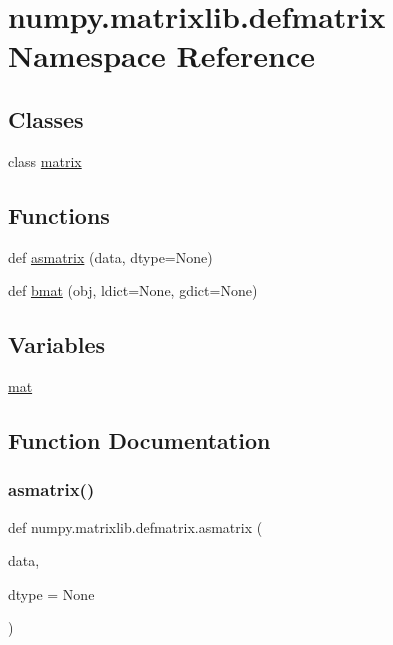 \hypertarget{namespacenumpy_1_1matrixlib_1_1defmatrix}{}\section{numpy.\+matrixlib.\+defmatrix Namespace Reference}
\label{namespacenumpy_1_1matrixlib_1_1defmatrix}
\subsection*{Classes}
\begin{DoxyCompactItemize}
\item 
class \hyperlink{classnumpy_1_1matrixlib_1_1defmatrix_1_1matrix}{matrix}
\end{DoxyCompactItemize}
\subsection*{Functions}
\begin{DoxyCompactItemize}
\item 
def \hyperlink{namespacenumpy_1_1matrixlib_1_1defmatrix_a4f175cbf1fd84e4278db145347496477}{asmatrix} (data, dtype=None)
\item 
def \hyperlink{namespacenumpy_1_1matrixlib_1_1defmatrix_a104688195ee702143122d056de815da2}{bmat} (obj, ldict=None, gdict=None)
\end{DoxyCompactItemize}
\subsection*{Variables}
\begin{DoxyCompactItemize}
\item 
\hyperlink{namespacenumpy_1_1matrixlib_1_1defmatrix_a2d2fc1443b6077c6e5a7989a5331fc62}{mat}
\end{DoxyCompactItemize}


\subsection{Function Documentation}
\mbox{\label{namespacenumpy_1_1matrixlib_1_1defmatrix_a4f175cbf1fd84e4278db145347496477}} 
\subsubsection{\texorpdfstring{asmatrix()}{asmatrix()}}
{\footnotesize\ttfamily def numpy.\+matrixlib.\+defmatrix.\+asmatrix (\begin{DoxyParamCaption}\item[{}]{data,  }\item[{}]{dtype = {\ttfamily None} }\end{DoxyParamCaption})}

